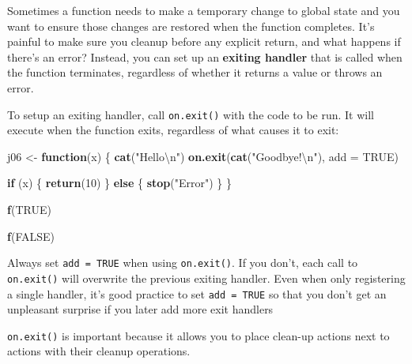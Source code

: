 \documentclass[]{book}
\newenvironment{Shaded}{\begin{snugshade}}{\end{snugshade}}
\newcommand{\CharTok}[1]{\textcolor[rgb]{0.31,0.60,0.02}{#1}}
\newcommand{\ControlFlowTok}[1]{\textcolor[rgb]{0.13,0.29,0.53}{\textbf{#1}}}
\newcommand{\DataTypeTok}[1]{\textcolor[rgb]{0.13,0.29,0.53}{#1}}
\newcommand{\DecValTok}[1]{\textcolor[rgb]{0.00,0.00,0.81}{#1}}
\newcommand{\KeywordTok}[1]{\textcolor[rgb]{0.13,0.29,0.53}{\textbf{#1}}}
\newcommand{\NormalTok}[1]{#1}
\newcommand{\OtherTok}[1]{\textcolor[rgb]{0.56,0.35,0.01}{#1}}
\newcommand{\StringTok}[1]{\textcolor[rgb]{0.31,0.60,0.02}{#1}}
\theoremstyle{definition}
\theoremstyle{definition}
\theoremstyle{definition}
\theoremstyle{remark}
\begin{document}
Sometimes a function needs to make a temporary change to global state
and you want to ensure those changes are restored when the function
completes. It's painful to make sure you cleanup before any explicit
return, and what happens if there's an error? Instead, you can set up an
\textbf{exiting handler} that is called when the function terminates,
regardless of whether it returns a value or throws an error.

To setup an exiting handler, call \texttt{on.exit()} with the code to be
run. It will execute when the function exits, regardless of what causes
it to exit:

\begin{Shaded}
\begin{Highlighting}[]
\NormalTok{j06 <-}\StringTok{ }\ControlFlowTok{function}\NormalTok{(x) \{}
  \KeywordTok{cat}\NormalTok{(}\StringTok{"Hello}\CharTok{\textbackslash{}n}\StringTok{"}\NormalTok{)}
  \KeywordTok{on.exit}\NormalTok{(}\KeywordTok{cat}\NormalTok{(}\StringTok{"Goodbye!}\CharTok{\textbackslash{}n}\StringTok{"}\NormalTok{), }\DataTypeTok{add =} \OtherTok{TRUE}\NormalTok{)}
  
  \ControlFlowTok{if}\NormalTok{ (x) \{}
    \KeywordTok{return}\NormalTok{(}\DecValTok{10}\NormalTok{)}
\NormalTok{  \} }\ControlFlowTok{else}\NormalTok{ \{}
    \KeywordTok{stop}\NormalTok{(}\StringTok{"Error"}\NormalTok{)}
\NormalTok{  \}}
\NormalTok{\}}

\KeywordTok{f}\NormalTok{(}\OtherTok{TRUE}\NormalTok{)}
\end{Highlighting}
\end{Shaded}

\begin{Shaded}
\begin{Highlighting}[]
\KeywordTok{f}\NormalTok{(}\OtherTok{FALSE}\NormalTok{)}
\end{Highlighting}
\end{Shaded}

Always set \texttt{add\ =\ TRUE} when using \texttt{on.exit()}. If you
don't, each call to \texttt{on.exit()} will overwrite the previous
exiting handler. Even when only registering a single handler, it's good
practice to set \texttt{add\ =\ TRUE} so that you don't get an
unpleasant surprise if you later add more exit handlers

\texttt{on.exit()} is important because it allows you to place clean-up
actions next to actions with their cleanup operations.
\end{document}
